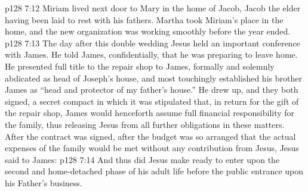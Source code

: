 \vs p128 7:12 Miriam lived next door to Mary in the home of Jacob, Jacob the elder having been laid to rest with his fathers. Martha took Miriam’s place in the home, and the new organization was working smoothly before the year ended.
\vs p128 7:13 \pc The day after this double wedding Jesus held an important conference with James. He told James, confidentially, that he was preparing to leave home. He presented full title to the repair shop to James, formally and solemnly abdicated as head of Joseph’s house, and most touchingly established his brother James as “head and protector of my father’s house.” He drew up, and they both signed, a secret compact in which it was stipulated that, in return for the gift of the repair shop, James would henceforth assume full financial responsibility for the family, thus releasing Jesus from all further obligations in these matters. After the contract was signed, after the budget was so arranged that the actual expenses of the family would be met without any contribution from Jesus, Jesus said to James: 
\vs p128 7:14 And thus did Jesus make ready to enter upon the second and home\hyp{}detached phase of his adult life before the public entrance upon his Father’s business.
